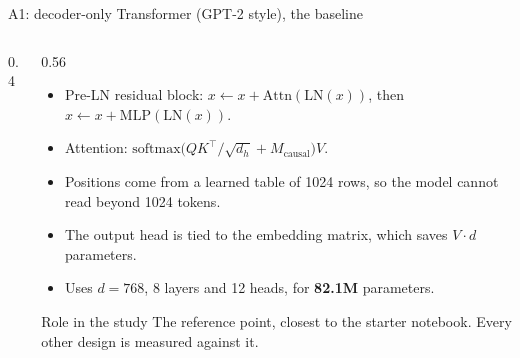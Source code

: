 \documentclass[aspectratio=169,11pt]{beamer}
\begin{document}
\begin{frame}{A1: decoder-only Transformer (GPT-2 style), the baseline}
  \begin{columns}[T]
    \begin{column}{0.4\textwidth}
      \centering
    \end{column}
    \begin{column}{0.56\textwidth}
      \small
      \begin{itemize}
        \item Pre-LN residual block: $x \leftarrow x + \text{Attn}(\text{LN}(x))$, then $x \leftarrow x + \text{MLP}(\text{LN}(x))$.
        \item Attention: $\text{softmax}\!\big(QK^\top/\sqrt{d_h} + M_{\text{causal}}\big)V$.
        \item Positions come from a learned table of 1024 rows, so the model \alert{cannot read beyond 1024 tokens}.
        \item The output head is tied to the embedding matrix, which saves $V\cdot d$ parameters.
        \item Uses $d=768$, 8 layers and 12 heads, for \textbf{82.1M} parameters.
      \end{itemize}
      \begin{block}{Role in the study}
        \small
        The reference point, closest to the starter notebook. Every other design is measured against it.
      \end{block}
    \end{column}
  \end{columns}
\end{frame}
\end{document}
